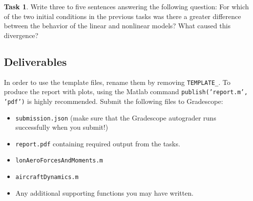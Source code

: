 \documentclass{article}
\theoremstyle{definition}
\newtheorem{task}{Task}
\begin{document}
\begin{task}
    Write three to five sentences answering the following question: For which of the two initial conditions in the previous tasks was there a greater difference between the behavior of the linear and nonlinear models? What caused this divergence?
\end{task}

\subsection*{Deliverables}
In order to use the template files, rename them by removing \texttt{TEMPLATE\_}. To produce the report with plots, using the Matlab command \texttt{publish('report.m', 'pdf')} is highly recommended. Submit the following files to Gradescope:

\begin{itemize}[noitemsep]
    \item \texttt{submission.json} (make sure that the Gradescope autograder runs successfully when you submit!)
    \item \texttt{report.pdf} containing required output from the tasks.
    \item \texttt{lonAeroForcesAndMoments.m}
    \item \texttt{aircraftDynamics.m}
    \item Any additional supporting functions you may have written.
\end{itemize}
\end{document}
